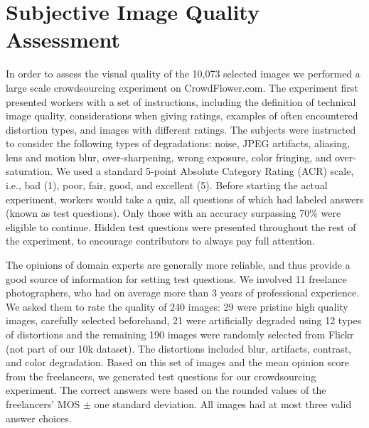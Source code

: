 \documentclass{article}
\begin{document}
\section{Subjective Image Quality Assessment} 




In order to assess the visual quality of the 10,073 selected images we performed a large scale crowdsourcing experiment on CrowdFlower.com. The experiment first presented workers with a set of instructions, including the definition of technical image quality, considerations when giving ratings, examples of often encountered distortion types, and images with different ratings. 
The subjects were instructed to consider the following types of degradations: noise, JPEG artifacts, aliasing, lens and motion blur, over-sharpening, wrong exposure, color fringing, and over-saturation.
We used a standard 5-point Absolute Category Rating (ACR) scale, i.e., bad (1), poor, fair, good, and excellent (5). Before starting the actual experiment, workers would take a quiz, all questions of which had labeled answers (known as test questions). Only those with an accuracy surpassing 70\% were eligible to continue. Hidden test questions were presented throughout the rest of the experiment, to encourage contributors to always pay full attention. 

The opinions of domain experts are generally more reliable, and thus provide a good source of information for setting test questions. We involved 11 freelance photographers, who had on average more than 3 years of professional experience. We asked them to rate the quality of 240 images: 29 were pristine high quality images, carefully selected beforehand, 21 were artificially degraded using 12 types of distortions and the remaining 190 images were randomly selected from Flickr (not part of our 10k dataset). The distortions included blur, artifacts, contrast, and color degradation. Based on this set of images and the mean opinion score from the freelancers, we generated test questions for our crowdsourcing experiment. The correct answers were based on the rounded values of the freelancers' MOS $\pm$ one standard deviation. All images had at most three valid answer choices.
\end{document}
